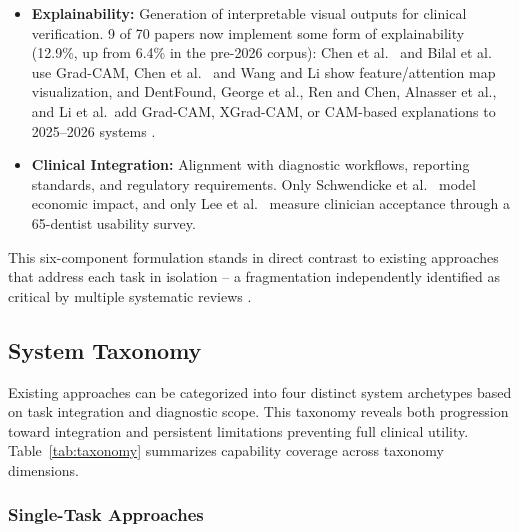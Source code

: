 \documentclass[conference]{IEEEtran}
\begin{document}
\begin{itemize}
    \item \textbf{Explainability:} Generation of interpretable visual
          outputs for clinical verification. 9 of 70 papers now
          implement some form of explainability (12.9\%, up from 6.4\%
          in the pre-2026 corpus): Chen et al.\
          \cite{chen2023deep} and Bilal et al.\ \cite{bilal2024pdcnet}
          use Grad-CAM, Chen et al.\ \cite{chen2024cariesxrays} and
          Wang and Li \cite{wang2026transformer} show feature/attention
          map visualization, and DentFound, George et al., Ren and
          Chen, Alnasser et al., and Li et al.\ add Grad-CAM,
          XGrad-CAM, or CAM-based explanations to 2025--2026 systems
          \cite{zhu2026dentfound,george2026explainable,ren2026dualbranch,alnasser2026advanced,li2025novel}.

    \item \textbf{Clinical Integration:} Alignment with diagnostic
          workflows, reporting standards, and regulatory requirements.
          Only Schwendicke et al.\ \cite{schwendicke2021cost} model
          economic impact, and only Lee et al.\ \cite{lee2025evaluation}
          measure clinician acceptance through a 65-dentist usability
          survey.
\end{itemize}

This six-component formulation stands in direct contrast to existing
approaches that address each task in isolation -- a fragmentation
independently identified as critical by multiple systematic reviews
\cite{iacob2025automated,albano2024artificial,bonfanti2025deep,
khubrani2025detection,zanini2024systematic,zhou2025deep}.

\subsection{System Taxonomy}

Existing approaches can be categorized into four distinct system
archetypes based on task integration and diagnostic scope. This taxonomy
reveals both progression toward integration and persistent limitations
preventing full clinical utility. Table~\ref{tab:taxonomy} summarizes
capability coverage across taxonomy dimensions.

\subsubsection{Single-Task Approaches}
\end{document}
